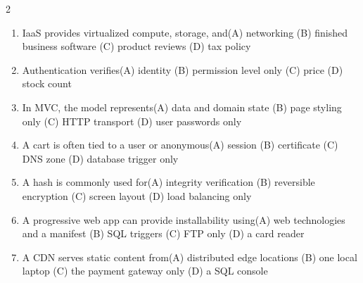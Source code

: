 \documentclass[a4paper]{article}
\begin{document}
\begin{multicols*}{2}
\begin{enumerate}[resume]
\item IaaS provides virtualized compute, storage, and\newline\hspace*{0.6em}(A) networking \quad (B) finished business software \newline\hspace*{0.6em}(C) product reviews \quad (D) tax policy
\item Authentication verifies\newline\hspace*{0.6em}(A) identity \quad (B) permission level only \newline\hspace*{0.6em}(C) price \quad (D) stock count
\item In MVC, the model represents\newline\hspace*{0.6em}(A) data and domain state \quad (B) page styling only \newline\hspace*{0.6em}(C) HTTP transport \quad (D) user passwords only
\item A cart is often tied to a user or anonymous\newline\hspace*{0.6em}(A) session \quad (B) certificate \newline\hspace*{0.6em}(C) DNS zone \quad (D) database trigger only
\item A hash is commonly used for\newline\hspace*{0.6em}(A) integrity verification \quad (B) reversible encryption \newline\hspace*{0.6em}(C) screen layout \quad (D) load balancing only
\item A progressive web app can provide installability using\newline\hspace*{0.6em}(A) web technologies and a manifest \quad (B) SQL triggers \newline\hspace*{0.6em}(C) FTP only \quad (D) a card reader
\item A CDN serves static content from\newline\hspace*{0.6em}(A) distributed edge locations \quad (B) one local laptop \newline\hspace*{0.6em}(C) the payment gateway only \quad (D) a SQL console

\end{enumerate}
\end{multicols*}
\end{document}
